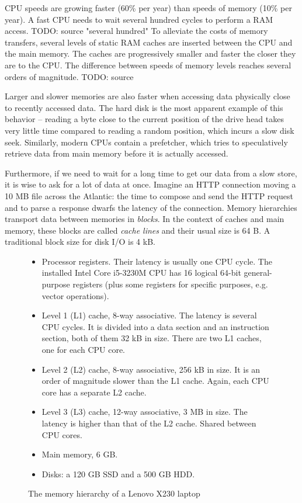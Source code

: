 CPU speeds are growing faster (60\% per year) than speeds of memory (10\% per
year)\cite{Ailamaki:2004:DAN:1316689.1316801}. A fast CPU needs to wait several
hundred cycles to perform a RAM access. TODO: source "several hundred"
To alleviate the costs of memory transfers, several levels of static RAM
caches are inserted between the CPU and the main memory. The caches are
progressively smaller and faster the closer they are to the CPU. The difference
between speeds of memory levels reaches several orders of magnitude. TODO: source

Larger and slower memories are also faster when accessing data physically
close to recently accessed data. The hard disk is the most apparent example
of this behavior -- reading a byte close to the current position of the drive
head takes very little time compared to reading a random position, which incurs
a slow disk seek. %
Similarly, modern CPUs contain a prefetcher, which tries to speculatively
retrieve data from main memory before it is actually accessed.

Furthermore, if we need to wait for a long time to get our data from a slow
store, it is wise to ask for a lot of data at once. Imagine an HTTP connection
moving a 10 MB file across the Atlantic: the time to compose and send the HTTP
request and to parse a response dwarfs the latency of the connection.
Memory hierarchies transport data between memories in \textit{blocks}.
In the context of caches and main memory, these blocks are called
\textit{cache lines} and their usual size is 64 B.
A traditional block size for disk I/O is 4 kB.

\begin{figure}
\begin{itemize}
\item Processor registers. Their latency is usually one CPU cycle.
	The installed Intel Core i5-3230M CPU has 16 logical 64-bit
	general-purpose registers (plus some registers for specific purposes,
	e.g. vector operations).
\item Level 1 (L1) cache, 8-way associative. The latency is several CPU cycles.
	It is divided into a data section and an instruction section,
	both of them 32 kB in size. There are two L1 caches, one for each CPU
	core.
\item Level 2 (L2) cache, 8-way associative, 256 kB in size.
	It is an order of magnitude slower than the L1 cache. Again, each
	CPU core has a separate L2 cache.
\item Level 3 (L3) cache, 12-way associative, 3 MB in size.
	The latency is higher than that of the L2 cache. Shared between CPU
	cores.
\item Main memory, 6 GB.
\item Disks: a 120 GB SSD and a 500 GB HDD.
\end{itemize}
\caption{The memory hierarchy of a Lenovo X230 laptop}
\end{figure}

